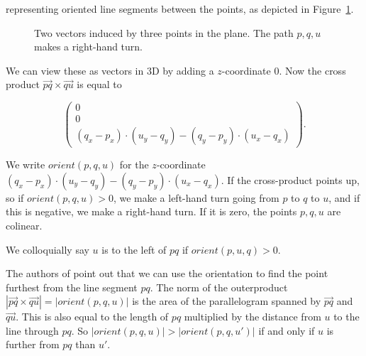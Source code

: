 representing oriented line segments between the points, as depicted in
Figure~\ref{fig:orient1}.

\begin{figure}[ht]
    \caption{Two vectors induced by three points in the plane. The path 
             $p, q, u$ makes a right-hand turn.}
    \label{fig:orient1}
\end{figure}

We can view these as vectors in 3D by adding a $z$-coordinate $0$. Now the
cross product $\vec{pq} \times \vec{qu}$ is equal to 

\[
    \begin{pmatrix}
        0 \\
        0 \\
        (q_x - p_x) \cdot (u_y - q_y) - (q_y - p_y) \cdot (u_x - q_x)
    \end{pmatrix}.
\]

We write $orient(p, q, u)$ for the $z$-coordinate
$(q_x - p_x) \cdot (u_y - q_y) - (q_y - p_y) \cdot (u_x - q_x)$. 
If the cross-product points up, so if $orient(p, q, u) > 0$, we make a left-hand 
turn going from $p$ to $q$ to $u$, and if this is negative, we make a right-hand
turn. If it is zero, the points $p, q, u$ are colinear. 

We colloquially say $u$ is to the left of $pq$ if $orient(p, u, q) > 0$.

The authors of \cite{quickerthanqhull} point out that we can use the 
orientation to find the point furthest from the line segment $pq$. 
The norm of the outerproduct
$|\vec{pq} \times \vec{qu}| = |orient(p, q, u)|$ is the area of the
parallelogram spanned by $\vec{pq}$ and $\vec{qu}$. This is also equal to
the length of $pq$ multiplied by the distance from $u$ to the line through 
$pq$. So $|orient(p, q, u)| > |orient(p, q, u')|$ if and only if $u$ is further
from $pq$ than $u'$. 

